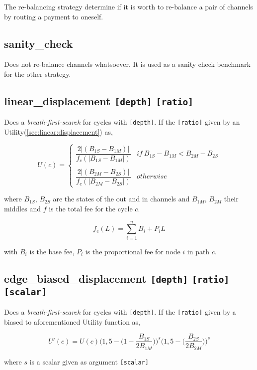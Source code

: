 The re-balancing strategy determine if it is worth to re-balance a pair of channels by routing a payment to oneself.

\subsection*{sanity\_check}

Does not re-balance channels whatsoever. It is used as a sanity check benchmark for the other strategy.

\subsection*{linear\_displacement \texttt{[depth]} \texttt{[ratio]}}

Does a \textit{breath-first-search} for cycles with \texttt{[depth]}. If the \texttt{[ratio]} given by an Utility(\ref{sec:linear:displacement}) as,

\[ U(c) = \begin{cases} 
\dfrac{2|(B_{1S} - B_{1M})|}{f_c(|B_{1S} - B_{1M}|)}  & if~B_{1S} - B_{1M} < B_{2M} - B_{2S} \\ 
\\
\dfrac{2|(B_{2M} - B_{2S})|}{f_c(|B_{2M} - B_{2S}|)}  & otherwise
\end{cases} \]

where $B_{1S}$, $B_{2S}$ are the states of the out and in channels and $B_{1M}$, $B_{2M}$ their middles and $f$ is the total fee for the cycle $c$. 

\[f_c(L) = \sum_{i=1}^{n} B_i + P_iL \]

with $B_i$ is the base fee, $P_i$ is the proportional fee for node $i$ in path $c$.

\subsection*{edge\_biased\_displacement \texttt{[depth]} \texttt{[ratio]} \texttt{[scalar]}}

Does a \textit{breath-first-search} for cycles with \texttt{[depth]}. If the \texttt{[ratio]} given by a biased to aforementioned Utility function as,

\[ U'(c) = U(c) \bigg(1,5 - \big(1 - \dfrac{B_{1S}}{2B_{1M}}\big) \bigg)^s \bigg(1,5 - \big(\dfrac{B_{2S}}{2B_{2M}}\big)\bigg)^s  \]

where $s$ is a scalar given as argument \texttt{[scalar]}
